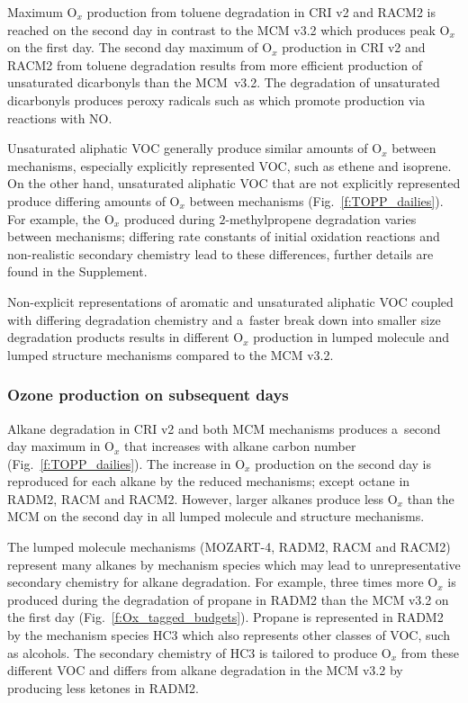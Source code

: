 \documentclass[acpd, online, hvmath]{copernicus}
\begin{document}
Maximum O$_{x}$ production from toluene degradation in CRI v2 and
RACM2 is reached on the second day in contrast to the MCM v3.2 which
produces peak O$_{x}$ on the first day.  The second day maximum of
O$_{x}$ production in CRI v2 and RACM2 from toluene degradation
results from more efficient production of unsaturated dicarbonyls than
the MCM~v3.2. The degradation of unsaturated dicarbonyls produces peroxy
radicals such as  which promote  production via reactions with NO.

Unsaturated aliphatic VOC generally produce similar amounts of
O$_{x}$ between mechanisms, especially explicitly represented VOC,
such as ethene and isoprene.  On the other hand, unsaturated aliphatic
VOC that are not explicitly represented produce differing amounts of
O$_{x}$ between mechanisms (Fig.~\ref{f:TOPP_dailies}).  For
example, the O$_{x}$ produced during $2$-methylpropene degradation
varies between mechanisms; differing rate constants of initial
oxidation reactions and non-realistic secondary chemistry lead to
these differences, further details are found in the Supplement.

Non-explicit representations of aromatic and unsaturated aliphatic VOC
coupled with differing degradation chemistry and a~faster break down
into smaller size degradation products results in different O$_{x}$
production in lumped molecule and lumped structure mechanisms compared
to the MCM v3.2.

\subsubsection{Ozone production on subsequent days}
\label{sss:profiles}

Alkane degradation in CRI v2 and both MCM mechanisms produces a~second
day maximum in O$_{x}$ that increases with alkane carbon number
(Fig.~\ref{f:TOPP_dailies}).  The increase in O$_{x}$ production on
the second day is reproduced for each alkane by the reduced
mechanisms; except octane in RADM2, RACM and RACM2.  However, larger
alkanes produce less O$_{x}$ than the MCM on the second day in all
lumped molecule and structure mechanisms.

The lumped molecule mechanisms (MOZART-4, RADM2, RACM and RACM2)
represent many alkanes by mechanism species which may lead to
unrepresentative secondary chemistry for alkane degradation.  For
example, three times more O$_{x}$ is produced during the
degradation of propane in RADM2 than the MCM v3.2 on the first day
(Fig.~\ref{f:Ox_tagged_budgets}).  Propane is represented in RADM2 by
the mechanism species HC3 which also represents other classes of VOC,
such as alcohols.  The secondary chemistry of HC3 is tailored to
produce O$_{x}$ from these different VOC and differs from alkane
degradation in the MCM v3.2 by producing less ketones in RADM2.
\end{document}
